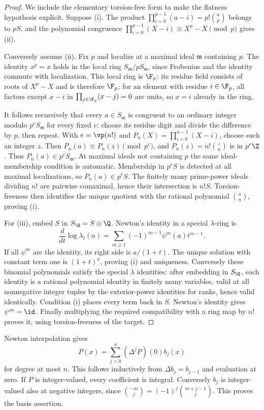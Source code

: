 \begin{proof}
We include the elementary torsion-free form to make the flatness hypothesis explicit. Suppose (i). The product $\prod_{i=0}^{p-1}(a-i)=p!\binom ap$ belongs to $pS$, and the polynomial congruence $\prod_{i=0}^{p-1}(X-i)\equiv X^p-X\pmod p$ gives (ii).

Conversely assume (ii). Fix $p$ and localize at a maximal ideal $\mathfrak m$ containing $p$. The identity $x^p=x$ holds in the local ring $S_{\mathfrak m}/pS_{\mathfrak m}$, since Frobenius and the identity commute with localization. This local ring is $\F_p$: its residue field consists of roots of $X^p-X$ and is therefore $\F_p$; for an element with residue $i\in\F_p$, all factors except $x-i$ in $\prod_{j\in\F_p}(x-j)=0$ are units, so $x=i$ already in the ring.

It follows recursively that every $a\in S_{\mathfrak m}$ is congruent to an ordinary integer modulo $p^eS_{\mathfrak m}$ for every fixed $e$: choose its residue digit and divide the difference by $p$, then repeat. With $e=\vp(n!)$ and $P_n(X)=\prod_{i=0}^{n-1}(X-i)$, choose such an integer $z$. Then $P_n(a)\equiv P_n(z)\pmod{p^e}$, and $P_n(z)=n!\binom zn$ is in $p^e\Z$. Thus $P_n(a)\in p^eS_{\mathfrak m}$. At maximal ideals not containing $p$ the same ideal-membership condition is automatic. Membership in $p^eS$ is detected at all maximal localizations, so $P_n(a)\in p^eS$. The finitely many prime-power ideals dividing $n!$ are pairwise comaximal, hence their intersection is $n!S$. Torsion-freeness then identifies the unique quotient with the rational polynomial $\binom an$, proving (i).

For (iii), embed $S$ in $S_\Q=S\otimes\Q$. Newton's identity in a special $\lambda$-ring is
\[
 \frac{d}{dt}\log\lambda_t(a)
 =\sum_{m\ge1}(-1)^{m-1}\psi^m(a)t^{m-1}.
\]
If all $\psi^m$ are the identity, its right side is $a/(1+t)$. The unique solution with constant term one is $(1+t)^a$, proving (i) and uniqueness. Conversely these binomial polynomials satisfy the special $\lambda$ identities: after embedding in $S_\Q$, each identity is a rational polynomial identity in finitely many variables, valid at all nonnegative integer tuples by the exterior-power identities for ranks, hence valid identically. Condition (i) places every term back in $S$. Newton's identity gives $\psi^m=\id$. Finally multiplying the required compatibility with a ring map by $n!$ proves it, using torsion-freeness of the target.
\end{proof}

Newton interpolation gives
\[
 P(x)=\sum_{j=0}^n (\Delta^jP)(0)b_j(x)
\]
for degree at most $n$. This follows inductively from $\Delta b_j=b_{j-1}$ and evaluation at zero. If $P$ is integer-valued, every coefficient is integral. Conversely $b_j$ is integer-valued also at negative integers, since $\binom{-m}j=(-1)^j\binom{m+j-1}j$. This proves the basis assertion.

